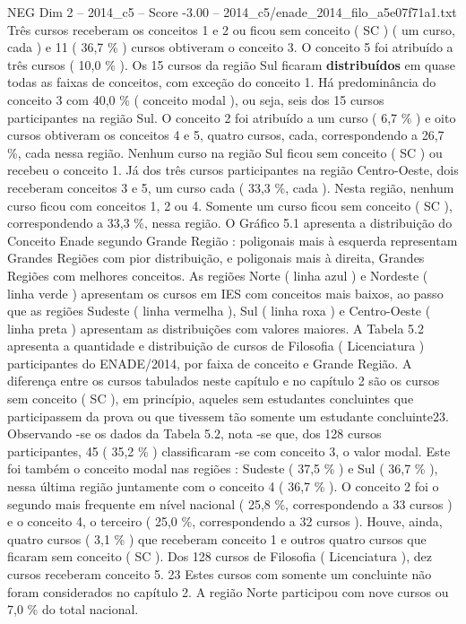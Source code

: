 \begin{textsample}{NEG Dim 2 – 2014\_c5 – Score -3.00 – 2014\_c5/enade\_2014\_filo\_a5e07f71a1.txt}
Três cursos receberam os conceitos 1 e 2 ou ficou sem conceito ( SC ) ( um curso, cada ) e 11 ( 36,7 \% ) cursos obtiveram o conceito 3.
O conceito 5 foi atribuído a três cursos ( 10,0 \% ).
Os 15 cursos da região Sul ficaram \textbf{distribuídos} em quase todas as faixas de conceitos, com exceção do conceito 1.
Há predominância do conceito 3 com 40,0 \% ( conceito modal ), ou seja, seis dos 15 cursos participantes na região Sul.
O conceito 2 foi atribuído a um curso ( 6,7 \% ) e oito cursos obtiveram os conceitos 4 e 5, quatro cursos, cada, correspondendo a 26,7 \%, cada nessa região.
Nenhum curso na região Sul ficou sem conceito ( SC ) ou recebeu o conceito 1.
Já dos três cursos participantes na região Centro-Oeste, dois receberam conceitos 3 e 5, um curso cada ( 33,3 \%, cada ).
Nesta região, nenhum curso ficou com conceitos 1, 2 ou 4.
Somente um curso ficou sem conceito ( SC ), correspondendo a 33,3 \%, nessa região.
O Gráfico 5.1 apresenta a distribuição do Conceito Enade segundo Grande Região : poligonais mais à esquerda representam Grandes Regiões com pior distribuição, e poligonais mais à direita, Grandes Regiões com melhores conceitos.
As regiões Norte ( linha azul ) e Nordeste ( linha verde ) apresentam os cursos em IES com conceitos mais baixos, ao passo que as regiões Sudeste ( linha vermelha ), Sul ( linha roxa ) e Centro-Oeste ( linha preta ) apresentam as distribuições com valores maiores.
A Tabela 5.2 apresenta a quantidade e distribuição de cursos de Filosofia ( Licenciatura ) participantes do ENADE/2014, por faixa de conceito e Grande Região.
A diferença entre os cursos tabulados neste capítulo e no capítulo 2 são os cursos sem conceito ( SC ), em princípio, aqueles sem estudantes concluintes que participassem da prova ou que tivessem tão somente um estudante concluinte23.
Observando -se os dados da Tabela 5.2, nota -se que, dos 128 cursos participantes, 45 ( 35,2 \% ) classificaram -se com conceito 3, o valor modal.
Este foi também o conceito modal nas regiões : Sudeste ( 37,5 \% ) e Sul ( 36,7 \% ), nessa última região juntamente com o conceito 4 ( 36,7 \% ).
O conceito 2 foi o segundo mais frequente em nível nacional ( 25,8 \%, correspondendo a 33 cursos ) e o conceito 4, o terceiro ( 25,0 \%, correspondendo a 32 cursos ).
Houve, ainda, quatro cursos ( 3,1 \% ) que receberam conceito 1 e outros quatro cursos que ficaram sem conceito ( SC ).
Dos 128 cursos de Filosofia ( Licenciatura ), dez cursos receberam conceito 5. 23 Estes cursos com somente um concluinte não foram considerados no capítulo 2.
A região Norte participou com nove cursos ou 7,0 \% do total nacional.

\end{textsample}
